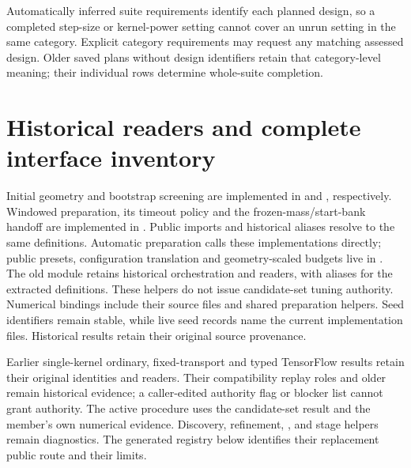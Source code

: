Automatically inferred suite requirements identify each planned design, so a
completed step-size or kernel-power setting cannot cover an unrun setting in
the same category. Explicit category requirements may request any matching
assessed design. Older saved plans without design identifiers retain that
category-level meaning; their individual rows determine whole-suite completion.



\section{Historical readers and complete interface inventory}

Initial geometry and bootstrap screening are implemented in
 and , respectively.
Windowed preparation, its timeout policy and the frozen-mass/start-bank handoff
are implemented in .
Public imports and historical  aliases resolve to the
same definitions. Automatic preparation calls these implementations directly;
public presets, configuration translation and geometry-scaled budgets live in
. The old module retains historical orchestration and
readers, with aliases for the extracted definitions.
These helpers do not issue candidate-set tuning authority. Numerical bindings
include their source files and shared preparation helpers. Seed identifiers
remain stable, while live seed records name the current implementation files.
Historical results retain their original source provenance.
\label{sec:bf-hmc-complete-interface-inventory}

Earlier single-kernel ordinary, fixed-transport and typed TensorFlow results
retain their original identities and readers. Their compatibility replay roles
and older  remain historical evidence; a
caller-edited authority flag or blocker list cannot grant authority. The active
procedure uses the candidate-set result and the member's own numerical evidence.
Discovery, refinement, , and stage
helpers remain diagnostics. The generated registry below identifies their
replacement public route and their limits.



